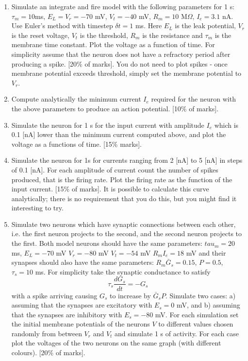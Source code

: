 \documentclass[11pt,a4paper]{scrartcl}
\begin{document}
\begin{enumerate}

\item Simulate an integrate and fire model with the following
  parameters for 1 s: $\tau_m = 10 $ms, $E_L = V_r = -70$ mV, $V_t =
  -40$ mV, $R_m= 10$ M$\Omega$, $I_e = 3.1 $ nA. Use Euler's method
  with timestep $\delta t = 1$ ms. Here $E_L$ is the leak potential,
  $V_r$ is the reset voltage, $V_t$ is the threshold, $R_m$ is the
  resistance and $\tau_m$ is the membrane time constant. Plot the
  voltage as a function of time. For simplicity assume that the neuron
  does not have a refractory period after producing a spike. [20\% of
    marks]. You do not need to plot spikes - once membrane potential
  exceeds threshold, simply set the membrane potential to $V_r$.

\item Compute analytically the minimum current $I_e$ required for the
  neuron with the above parameters to produce an action
  potential. [10\% of marks].

\item Simulate the neuron for 1 s for the input current with amplitude
  $I_e$ which is 0.1 [nA] lower than the minimum current computed
  above, and plot the voltage as a functions of time. [15\% marks].

\item Simulate the neuron for 1s for currents ranging from 2 [nA] to 5
  [nA] in steps of 0.1 [nA]. For each amplitude of current count the
  number of spikes produced, that is the firing rate. Plot the firing
  rate as the function of the input current. [15\% of marks]. It is
  possible to calculate this curve analytically; there is no
  requirement that you do this, but you might find it interesting to
  try.

\item Simulate two neurons which have synaptic connections between each other, i.e. the first neuron projects to the second, and the second neuron projects to the first. Both model neurons should have the same parameters: $tau_m = 20$ ms, $E_L = -70$ mV $V_r = -80$ mV $V_t = -54$ mV $R_mI_e = 18$ mV and their synapses should also have the same parameters: $R_m \bar{G}_s = 0.15$, $P = 0.5$, $\tau_s= 10$ ms. For simplicity take the synaptic conductance to satisfy
\begin{equation}
\tau_s\frac{dG_s}{dt}=-G_s
\end{equation}
with a spike arriving causing $G_s$ to increase by $\bar{G}_sP$. Simulate two cases: a) assuming that the synapses are excitatory with $E_s = 0$ mV, and b) assuming that the synapses are inhibitory with $E_s = -80$ mV. For each simulation set the initial membrane potentials of the neurons $V$ to different values chosen randomly from between $V_r$ and $V_t$ and simulate 1 s of activity. For each case plot the voltages of the two neurons on the same graph (with different colours). [20\% of marks].


\end{enumerate}
\end{document}

